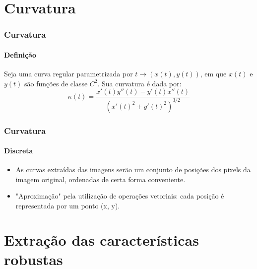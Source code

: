 \documentclass{beamer}
\begin{document}
    \section{Curvatura}
    
    \begin{frame}
      \frametitle{Curvatura}
      \framesubtitle{Definição}
        Seja uma curva regular parametrizada por $t \rightarrow (x(t), y(t))$, em que $x(t)$ e $y(t)$ são funções de classe $C^2$. Sua curvatura é dada por:
        $$\kappa (t) = \frac{x'(t) y''(t) - y'(t) x''(t)}{(x'(t)^2 + y'(t)^2)^{3/2}}$$   
    \end{frame}
    
    \begin{frame}
      \frametitle{Curvatura}
      \framesubtitle{Discreta}
        \begin{itemize}
          \item As curvas extraídas das imagens serão um conjunto de posições dos pixels da imagem original, ordenadas de certa forma conveniente.
          \bigskip
          \item "Aproximação" pela utilização de operações vetoriais: cada posição é representada por um ponto (x, y).
          \bigskip
        \end{itemize}
    \end{frame}
    
    \section{Extração das características robustas}
    
\end{document}

